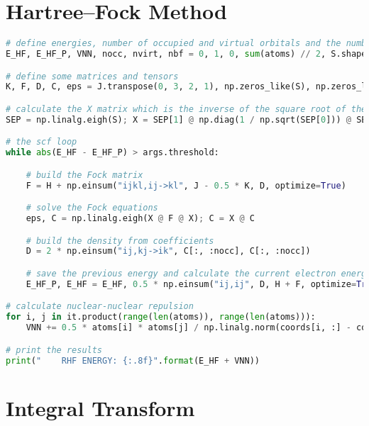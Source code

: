 \section{\texorpdfstring{Hartree--Fock Method\label{sec:hf_code_solution}}{Hartree--Fock Method}}

\raggedbottom\begin{lstlisting}[language=Python, caption={\acrshort{hf} method exercise code solution.}, label=code:hf_solution]
# define energies, number of occupied and virtual orbitals and the number of basis functions
E_HF, E_HF_P, VNN, nocc, nvirt, nbf = 0, 1, 0, sum(atoms) // 2, S.shape[0] - sum(atoms) // 2, S.shape[0]

# define some matrices and tensors
K, F, D, C, eps = J.transpose(0, 3, 2, 1), np.zeros_like(S), np.zeros_like(S), np.zeros_like(S), np.array(nbf * [0])

# calculate the X matrix which is the inverse of the square root of the overlap matrix
SEP = np.linalg.eigh(S); X = SEP[1] @ np.diag(1 / np.sqrt(SEP[0])) @ SEP[1].T

# the scf loop
while abs(E_HF - E_HF_P) > args.threshold:

    # build the Fock matrix
    F = H + np.einsum("ijkl,ij->kl", J - 0.5 * K, D, optimize=True)

    # solve the Fock equations
    eps, C = np.linalg.eigh(X @ F @ X); C = X @ C

    # build the density from coefficients
    D = 2 * np.einsum("ij,kj->ik", C[:, :nocc], C[:, :nocc])

    # save the previous energy and calculate the current electron energy
    E_HF_P, E_HF = E_HF, 0.5 * np.einsum("ij,ij", D, H + F, optimize=True)

# calculate nuclear-nuclear repulsion
for i, j in it.product(range(len(atoms)), range(len(atoms))):
    VNN += 0.5 * atoms[i] * atoms[j] / np.linalg.norm(coords[i, :] - coords[j, :]) if i != j else 0

# print the results
print("    RHF ENERGY: {:.8f}".format(E_HF + VNN))
\end{lstlisting}

\section{\texorpdfstring{Integral Transform\label{sec:int_code_solution}}{Integral Transform}}

